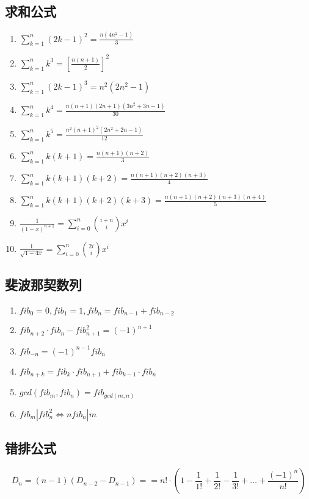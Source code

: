 \begin{spacing}{0.1}
\subsection*{求和公式}
	\begin{enumerate}
		\item $\sum_{k=1}^{n}(2k-1)^2 = \frac{n(4n^2-1)}{3}	$
		\item $\sum_{k=1}^{n}k^3 = [\frac{n(n+1)}{2}]^2	$
		\item $\sum_{k=1}^{n}(2k-1)^3 = n^2(2n^2-1)	$
		\item $\sum_{k=1}^{n}k^4 = \frac{n(n+1)(2n+1)(3n^2+3n-1)}{30}  $
		\item $\sum_{k=1}^{n}k^5 = \frac{n^2(n+1)^2(2n^2+2n-1)}{12}	$
		\item $\sum_{k=1}^{n}k(k+1) = \frac{n(n+1)(n+2)}{3}	$
		\item $\sum_{k=1}^{n}k(k+1)(k+2) = \frac{n(n+1)(n+2)(n+3)}{4} $
		\item $\sum_{k=1}^{n}k(k+1)(k+2)(k+3) = \frac{n(n+1)(n+2)(n+3)(n+4)}{5} $
		\item $\displaystyle \frac{1}{(1 - x)^{n + 1}} = \sum_{i = 0}^{n}\binom{i + n}{i}x^i$
		\item $\displaystyle \frac{1}{\sqrt{1 - 4x}} = \sum_{i = 0}^{n}\binom{2i}{i}x^i$
	\end{enumerate}
\subsection*{斐波那契数列}
	\begin{enumerate}
		\item $fib_0=0, fib_1=1, fib_n=fib_{n-1}+fib_{n-2}$
		\item $fib_{n+2} \cdot fib_n-fib_{n+1}^2=(-1)^{n+1}$
		\item $fib_{-n}=(-1)^{n-1}fib_n$
		\item $fib_{n+k}=fib_k \cdot fib_{n+1}+fib_{k-1} \cdot fib_n$
		\item $gcd(fib_m, fib_n)=fib_{gcd(m, n)}$
		\item $fib_m|fib_n^2\Leftrightarrow nfib_n|m$
	\end{enumerate}
\subsection*{错排公式}
	\[D_n = (n-1)(D_{n-2}-D_{n-1})= = n! \cdot (1-\frac{1}{1!}+\frac{1}{2!}-\frac{1}{3!}+\ldots+\frac{(-1)^n}{n!})\]

\end{spacing}

